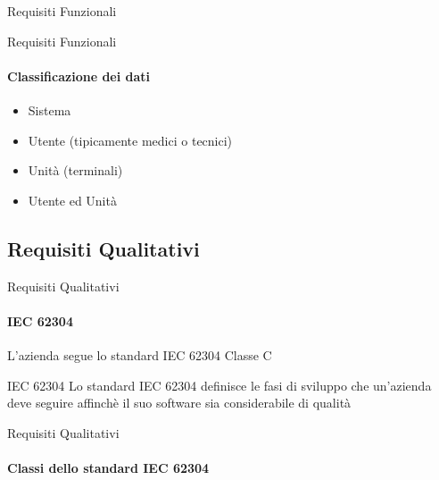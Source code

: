 \documentclass{beamer}
\begin{document}
\begin{darkframes}
\begin{frame}{Requisiti Funzionali}
    \end{frame}

    \begin{frame}{Requisiti Funzionali}
      \framesubtitle{Classificazione dei dati}
      \begin{itemize}
        \item Sistema
        \item Utente (tipicamente medici o tecnici)
        \item Unità (terminali)
        \item Utente ed Unità
      \end{itemize}

    \end{frame}

    \subsection{Requisiti Qualitativi}
    \begin{frame}{Requisiti Qualitativi}
      \framesubtitle{IEC 62304}

      L'azienda segue lo standard IEC 62304 Classe C

      \begin{block}{IEC 62304}
        Lo standard IEC 62304 definisce le fasi di sviluppo che un'azienda deve seguire affinchè il suo software sia considerabile di qualità
      \end{block}

    \end{frame}

    \begin{frame}{Requisiti Qualitativi}
      \framesubtitle{Classi dello standard IEC 62304}


\end{frame}
\end{darkframes}
\end{document}
